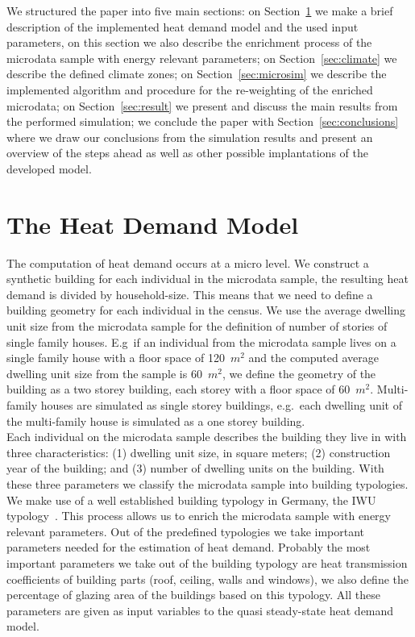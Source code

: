\documentclass[runningheads,a4paper]{llncs}
\begin{document}
We structured the paper into five main sections:
on Section~\ref{sec:heat} we make a brief description of the implemented heat
demand model and the used input parameters, on this section we also describe
the enrichment process of the microdata sample with energy relevant parameters;
on Section~\ref{sec:climate} we describe the defined climate zones;
on Section~\ref{sec:microsim} we describe the implemented algorithm and
procedure for the re-weighting of the enriched microdata;
on Section~\ref{sec:result} we present and discuss the main results from the
performed simulation;
we conclude the paper with Section~\ref{sec:conclusions} where we draw our
conclusions from the simulation results and present an overview of the steps
ahead as well as other possible implantations of the developed model.
\\

\section{The Heat Demand Model}\label{sec:heat}

The computation of heat demand occurs at a micro level.
We construct a synthetic building for each individual in the microdata sample,
the resulting heat demand is divided by household-size.
This means that we need to define a building geometry for each individual in
the census.
We use the average dwelling unit size from the microdata sample for the
definition of number of stories of single family houses.
E.g\ if an individual from the microdata sample lives on a single family house
with a floor space of 120~$m^2$ and the computed average dwelling unit size
from the sample is 60~$m^2$, we define the geometry of the building as a two
storey building, each storey with a floor space of 60~$m^2$.
Multi-family houses are simulated as single storey buildings, e.g.\ each
dwelling unit of the multi-family house is simulated as a one storey building.
\\

Each individual on the microdata sample describes the building they live in with
three characteristics: (1) dwelling unit size, in square meters; (2)
construction year of the building; and (3) number of dwelling units on the
building. With these three parameters we classify the microdata sample into building
typologies. We make use of a well established building typology in Germany, the
IWU typology~\cite{Diefenbach.2010b,Loga.2011}. This process allows us to
enrich the microdata sample with energy relevant parameters. Out of the
predefined typologies we take important parameters needed for the estimation of
heat demand. Probably the most important parameters we take out of the building
typology are heat transmission coefficients of building parts (roof, ceiling,
walls and windows), we also define the percentage of glazing area of the
buildings based on this typology.
All these parameters are given as input variables to the quasi steady-state heat
demand model.
\\
\end{document}
